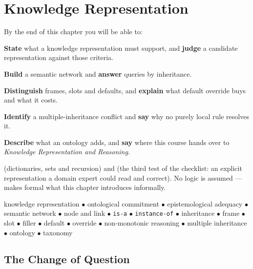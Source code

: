 \chapter{Knowledge Representation}\label{ch:kr}

\begin{outcomes}
By the end of this chapter you will be able to:
\begin{tight}
  \item \textbf{State} what a knowledge representation must support, and
        \textbf{judge} a candidate representation against those criteria.
  \item \textbf{Build} a semantic network and \textbf{answer} queries by
        inheritance.
  \item \textbf{Distinguish} frames, slots and defaults, and \textbf{explain} what
        default override buys and what it costs.
  \item \textbf{Identify} a multiple-inheritance conflict and \textbf{say} why no
        purely local rule resolves it.
  \item \textbf{Describe} what an ontology adds, and \textbf{say} where this course
        hands over to \emph{Knowledge Representation and Reasoning}.
\end{tight}
\end{outcomes}

\begin{prereq}
 (dictionaries, sets and recursion) and  (the
third test of the checklist: an explicit representation a domain expert could read
and correct). No logic is assumed ---  makes formal what this
chapter introduces informally.
\end{prereq}

\begin{keyterms}
knowledge representation $\bullet$ ontological commitment $\bullet$
epistemological adequacy $\bullet$ semantic network $\bullet$ node and link
$\bullet$ \texttt{is-a} $\bullet$ \texttt{instance-of} $\bullet$ inheritance
$\bullet$ frame $\bullet$ slot $\bullet$ filler $\bullet$ default $\bullet$
override $\bullet$ non-monotonic reasoning $\bullet$ multiple inheritance
$\bullet$ ontology $\bullet$ taxonomy
\end{keyterms}

\section{The Change of Question}

